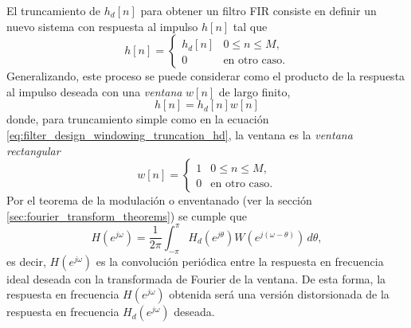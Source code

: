 \documentclass[a4paper]{report}
\begin{document}
El truncamiento de \(h_d[n]\) para obtener un filtro FIR consiste en definir un nuevo sistema con respuesta al impulso \(h[n]\) tal que 
\begin{equation}\label{eq:filter_design_windowing_truncation_hd}
 h[n]=\left\{ 
 \begin{array}{ll}
  h_d[n] & 0\leq n\leq M,\\ 
  0 & \textrm{en otro caso.}
 \end{array}
 \right. 
\end{equation}
Generalizando, este proceso se puede considerar como el producto de la respuesta al impulso deseada con una \emph{ventana} \(w[n]\) de largo finito,
\[
 h[n]=h_d[n]w[n]
\]
donde, para truncamiento simple como en la ecuación \ref{eq:filter_design_windowing_truncation_hd}, la ventana es la \emph{ventana rectangular}
\[
  w[n]=\left\{ 
 \begin{array}{ll}
  1 & 0\leq n\leq M,\\ 
  0 & \textrm{en otro caso.}
 \end{array}
 \right. 
\]
Por el teorema de la modulación o enventanado (ver la sección \ref{sec:fourier_transform_theorems}) se cumple que 
\begin{equation}\label{eq:filter_design_windowing_convolution_freq_domain}
 H(e^{j\omega})=\frac{1}{2\pi}\int_{-\pi}^\pi H_d(e^{j\theta})W(e^{j(\omega-\theta)})\,d\theta, 
\end{equation}
es decir, \(H(e^{j\omega})\) es la convolución periódica entre la respuesta en frecuencia ideal deseada con la transformada de Fourier de la ventana. De esta forma, la respuesta en frecuencia \(H(e^{j\omega})\) obtenida será una versión distorsionada de la respuesta en frecuencia \(H_d(e^{j\omega})\) deseada.
\end{document}
